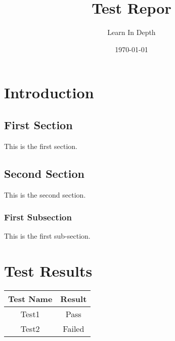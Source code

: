 \documentclass[12pt, letterpaper]{report}
\title{Test Repor}
\author{Learn In Depth}
\date{\today}
\begin{document}
\chapter{Introduction}

\section{First Section}

This is the first section.

\section{Second Section}

This is the second section.

\subsection{First Subsection}

This is the first sub-section.

\chapter{Test Results}

\begin{center}
    \begin{tabular}{||c | c ||}  \hline
        Test Name & Result \\ \hline\hline
        Test1 & Pass \\  \hline
        Test2 & Failed \\ \hline
   \end{tabular}
\end{center}
\end{document}
